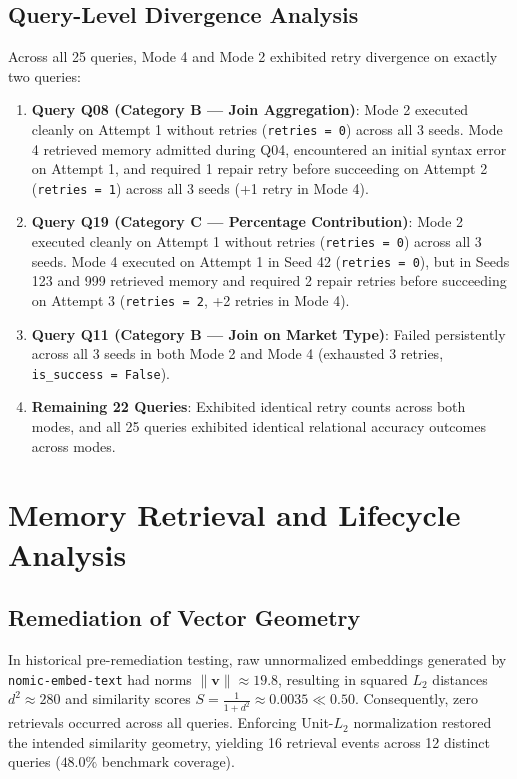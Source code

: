 \documentclass[conference]{IEEEtran}
\begin{document}
\subsection{Query-Level Divergence Analysis}
Across all 25 queries, Mode 4 and Mode 2 exhibited retry divergence on exactly two queries:
\begin{enumerate}
    \item \textbf{Query Q08 (Category B --- Join Aggregation)}: Mode 2 executed cleanly on Attempt 1 without retries (\texttt{retries = 0}) across all 3 seeds. Mode 4 retrieved memory admitted during Q04, encountered an initial syntax error on Attempt 1, and required 1 repair retry before succeeding on Attempt 2 (\texttt{retries = 1}) across all 3 seeds (+1 retry in Mode 4).
    \item \textbf{Query Q19 (Category C --- Percentage Contribution)}: Mode 2 executed cleanly on Attempt 1 without retries (\texttt{retries = 0}) across all 3 seeds. Mode 4 executed on Attempt 1 in Seed 42 (\texttt{retries = 0}), but in Seeds 123 and 999 retrieved memory and required 2 repair retries before succeeding on Attempt 3 (\texttt{retries = 2}, +2 retries in Mode 4).
    \item \textbf{Query Q11 (Category B --- Join on Market Type)}: Failed persistently across all 3 seeds in both Mode 2 and Mode 4 (exhausted 3 retries, \texttt{is\_success = False}).
    \item \textbf{Remaining 22 Queries}: Exhibited identical retry counts across both modes, and all 25 queries exhibited identical relational accuracy outcomes across modes.
\end{enumerate}

\section{Memory Retrieval and Lifecycle Analysis}

\subsection{Remediation of Vector Geometry}
In historical pre-remediation testing, raw unnormalized embeddings generated by \texttt{nomic-embed-text} had norms $\|\mathbf{v}\| \approx 19.8$, resulting in squared $L_2$ distances $d^2 \approx 280$ and similarity scores $S = \frac{1}{1 + d^2} \approx 0.0035 \ll 0.50$. Consequently, zero retrievals occurred across all queries. Enforcing Unit-$L_2$ normalization restored the intended similarity geometry, yielding 16 retrieval events across 12 distinct queries ($48.0\%$ benchmark coverage).
\end{document}
